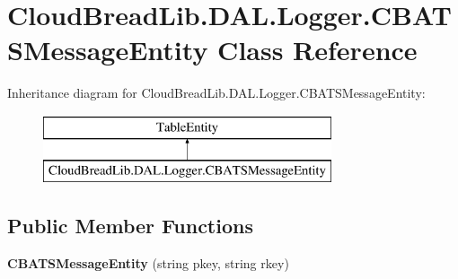 \hypertarget{class_cloud_bread_lib_1_1_d_a_l_1_1_logger_1_1_c_b_a_t_s_message_entity}{}\section{Cloud\+Bread\+Lib.\+D\+A\+L.\+Logger.\+C\+B\+A\+T\+S\+Message\+Entity Class Reference}
\label{class_cloud_bread_lib_1_1_d_a_l_1_1_logger_1_1_c_b_a_t_s_message_entity}
Inheritance diagram for Cloud\+Bread\+Lib.\+D\+A\+L.\+Logger.\+C\+B\+A\+T\+S\+Message\+Entity\+:\begin{figure}[H]
\begin{center}
\leavevmode
\includegraphics[height=2.000000cm]{class_cloud_bread_lib_1_1_d_a_l_1_1_logger_1_1_c_b_a_t_s_message_entity}
\end{center}
\end{figure}
\subsection*{Public Member Functions}
\begin{DoxyCompactItemize}
\item 
{\bfseries C\+B\+A\+T\+S\+Message\+Entity} (string pkey, string rkey)\hypertarget{class_cloud_bread_lib_1_1_d_a_l_1_1_logger_1_1_c_b_a_t_s_message_entity_a5753cc25d529c49183a0b8d089bb4f92}{}\label{class_cloud_bread_lib_1_1_d_a_l_1_1_logger_1_1_c_b_a_t_s_message_entity_a5753cc25d529c49183a0b8d089bb4f92}

\end{DoxyCompactItemize}
